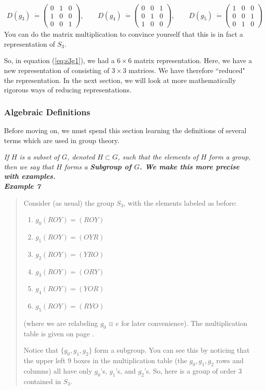 \documentclass[12pt,epsf]{article}
\def\nolabel{\nonumber }
\def\nolabel{\nonumber }
\begin{document}
\begin{eqnarray}
D(g_3)~\dot{=} 
\begin{pmatrix}
0 & 1 & 0 \\ 1 & 0 & 0 \\ 0 & 0 & 1
\end{pmatrix},\qquad
D(g_4)~\dot{=} 
\begin{pmatrix}
0 & 0 & 1 \\ 0 & 1 & 0 \\ 1 & 0 & 0
\end{pmatrix},\qquad
D(g_5)~\dot{=} 
\begin{pmatrix}
1 & 0 & 0 \\ 0 & 0 & 1 \\ 0 & 1 & 0
\end{pmatrix} \qquad \nolabel
\end{eqnarray}
You can do the matrix multiplication to convince yourself that this is
in fact a representation of $S_3$.  

So, in equation (\ref{eq:s3g1}), we had a $6\times 6$
matrix representation.	Here, we have a new representation of consisting of $3\times
3$ matrices.  We have therefore ``reduced" the representation.	In the
next section, we will look at more mathematically rigorous ways of
reducing representations.  

\subsubsection{Algebraic Definitions}

Before moving on, we must spend this section learning the definitions
of several terms which are used in group theory.  

\it If $H$ is a subset of $G$, denoted $H \subset G$, such that the
elements of $H$ form a group, then we say that $H$ forms a \bf Subgroup
\it of $G$\rm.	
We make this more precise with examples.  \\

\newpage
\bf Example 7 \rm
\vspace*{-2ex}
\begin{quote}
Consider (as usual) the group $S_3$, with the
elements labeled as before:
\begin{enumerate}
\parskip 0pt
\item $g_0(ROY) = (ROY)$
\item $g_1(ROY) = (OYR)$
\item $g_2(ROY) = (YRO)$
\item $g_3(ROY) = (ORY)$
\item $g_4(ROY) = (YOR)$
\item $g_5(ROY) = (RYO)$
\end{enumerate}
(where we are relabeling $g_0 \equiv e$ for later convenience).  The
multiplication table is given on page \pageref{s3}.  

Notice that $\{g_0, g_1, g_2\}$ form a subgroup.	You can see this by
noticing that the upper left 9 boxes in the multiplication table (the
$g_0, g_1, g_2$ rows and columns) all have only $g_0$'s, $g_1$'s, and
$g_2$'s.  So, here is a group of order 3 contained in $S_3$.	
\end{quote}
\end{document}
